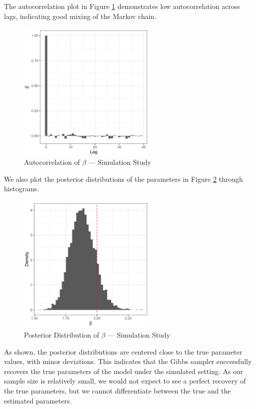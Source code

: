 The autocorrelation plot in Figure \ref{fig:simulation_autocorrelation} demonstrates low autocorrelation across lags, indicating good mixing of the Markov chain.

\begin{figure}[H]
\centering
\includegraphics[width=0.6\textwidth]{../figures/simulation/acf_beta.png}
\caption{Autocorrelation of $\beta$ --- Simulation Study}
\label{fig:simulation_autocorrelation}
\end{figure}

We also plot the posterior distributions of the parameters in Figure \ref{fig:posterior_distributions} through histograms.

\begin{figure}[H]
\centering
\includegraphics[width=0.6\textwidth]{../figures/simulation/hist_beta.png}
\caption{Posterior Distribution of $\beta$ --- Simulation Study}
\label{fig:posterior_distributions}
\end{figure}

As shown, the posterior distributions are centered close to the true parameter values, with minor deviations. This indicates that the Gibbs sampler successfully recovers the true parameters of the model under the simulated setting. As our sample size is relatively small, we would not expect to see a perfect recovery of the true parameters, but we cannot differentiate between the true and the estimated parameters. 

